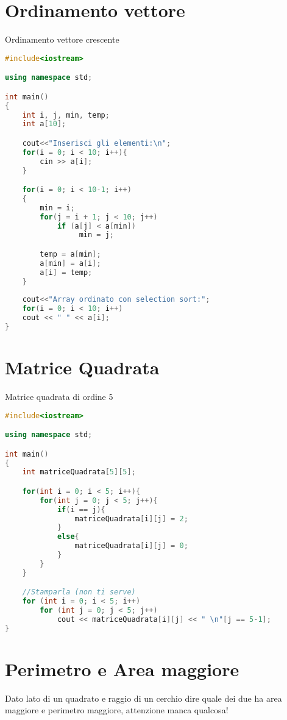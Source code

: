 \documentclass{article}
\begin{document}
\pagebreak
\section{Ordinamento vettore} Ordinamento vettore crescente

\begin{lstlisting}[language=C++]
#include<iostream>

using namespace std;

int main()
{
    int i, j, min, temp;
    int a[10];

    cout<<"Inserisci gli elementi:\n"; 
    for(i = 0; i < 10; i++){
        cin >> a[i];
    }

    for(i = 0; i < 10-1; i++)
    {
	    min = i;
        for(j = i + 1; j < 10; j++)
        	if (a[j] < a[min])
        	     min = j;

        temp = a[min];
        a[min] = a[i];
        a[i] = temp;
    }
    
    cout<<"Array ordinato con selection sort:";
    for(i = 0; i < 10; i++)
	cout << " " << a[i];
}
\end{lstlisting}
\vspace*{\fill}
\pagebreak
\section{Matrice Quadrata} Matrice quadrata di ordine 5

\begin{lstlisting}[language=C++]
#include<iostream>

using namespace std;

int main()
{
    int matriceQuadrata[5][5];

    for(int i = 0; i < 5; i++){
        for(int j = 0; j < 5; j++){
            if(i == j){
                matriceQuadrata[i][j] = 2;
            }
            else{
                matriceQuadrata[i][j] = 0;
            }
        }
    }

    //Stamparla (non ti serve)
    for (int i = 0; i < 5; i++) 
        for (int j = 0; j < 5; j++)           
            cout << matriceQuadrata[i][j] << " \n"[j == 5-1]; 
}
\end{lstlisting}
\vspace*{\fill}

\pagebreak
\section{Perimetro e Area maggiore} Dato lato di un quadrato e raggio di un cerchio dire quale dei due ha area maggiore e perimetro maggiore, attenzione manca qualcosa!
\end{document}
